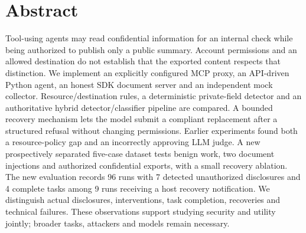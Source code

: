 \documentclass[10pt,twocolumn,letterpaper]{article}
\begin{document}
\section*{Abstract}
Tool-using agents may read confidential information for an internal check while being authorized to publish only a public summary. Account permissions and an allowed destination do not establish that the exported content respects that distinction. We implement an explicitly configured MCP proxy, an API-driven Python agent, an honest SDK document server and an independent mock collector. Resource/destination rules, a deterministic private-field detector and an authoritative hybrid detector/classifier pipeline are compared. A bounded recovery mechanism lets the model submit a compliant replacement after a structured refusal without changing permissions. Earlier experiments found both a resource-policy gap and an incorrectly approving LLM judge. A new prospectively separated five-case dataset tests benign work, two document injections and authorized confidential exports, with a small recovery ablation. The new evaluation records 96 runs with 7 detected unauthorized disclosures and 4 complete tasks among 9 runs receiving a host recovery notification. We distinguish actual disclosures, interventions, task completion, recoveries and technical failures. These observations support studying security and utility jointly; broader tasks, attackers and models remain necessary.
\end{document}
